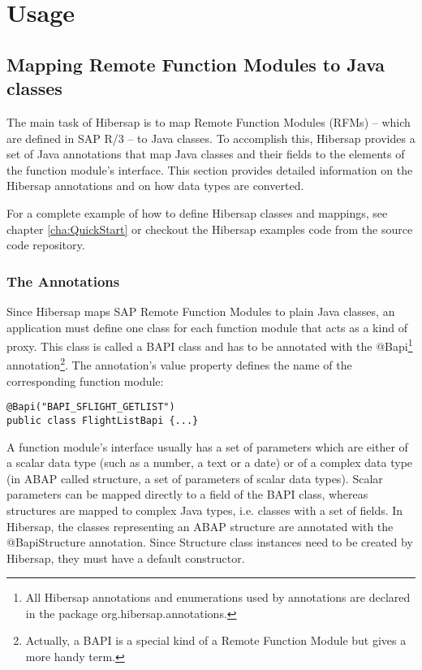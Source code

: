 \chapter{Usage}
\label{cha:Usage}

\section{Mapping Remote Function Modules to Java classes} 
\label{cha:Mapping}
The main task of Hibersap is to map Remote Function Modules (RFMs) -- which are defined in SAP R/3 -- to Java classes. To accomplish this, Hibersap provides a set of Java annotations that map Java classes and their fields to the elements of the function module's interface. This section provides detailed information on the Hibersap annotations and on how data types are converted.

For a complete example of how to define Hibersap classes and mappings, see chapter \ref{cha:QuickStart} or checkout the Hibersap examples code from the source code repository.

\subsection{The Annotations}
Since Hibersap maps SAP Remote Function Modules to plain Java classes, an application must define one class for each function module that acts as a kind of proxy. This class is called a BAPI class and has to be annotated with the @Bapi\footnote{All Hibersap annotations and enumerations used by annotations are declared in the package org.hibersap.annotations.} annotation\footnote{Actually, a BAPI is a special kind of a Remote Function Module but gives a more handy term.}. The annotation's value property defines the name of the corresponding function module:

\begin{lstlisting}
@Bapi("BAPI_SFLIGHT_GETLIST") 
public class FlightListBapi {...}
\end{lstlisting}

A function module's interface usually has a set of parameters which are either of a scalar data type (such as a number, a text or a date) or of a complex data type (in ABAP called structure, a set of parameters of scalar data types). Scalar parameters can be mapped directly to a field of the BAPI class, whereas structures are mapped to complex Java types, i.e. classes with a set of fields. In Hibersap, the classes representing an ABAP structure are annotated with the @BapiStructure annotation. Since Structure class instances need to be created by Hibersap, they must have a default constructor.

